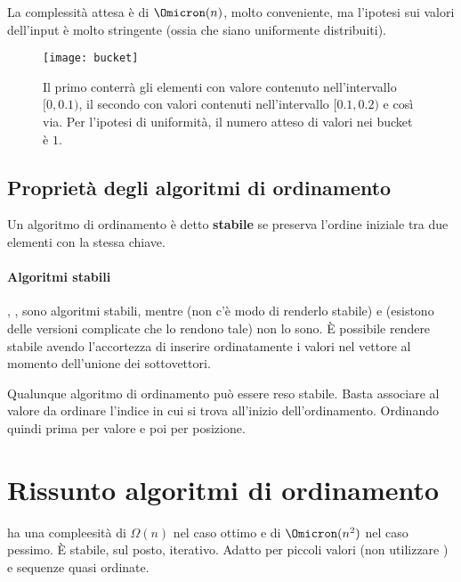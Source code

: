 La complessità attesa è di \(\Omicron(n)\), molto conveniente, ma l'ipotesi sui valori dell'input è molto stringente (ossia che siano uniformente distribuiti).

\begin{figure}[H]\centering
    \texttt{[image: bucket]}
    \caption[]{Il primo  conterrà gli elementi con valore contenuto nell'intervallo \([0, 0.1)\), il secondo con valori contenuti nell'intervallo \([0.1, 0.2)\) e così via. Per l'ipotesi di uniformità, il numero atteso di valori nei bucket è \(1\).}
\end{figure}

\clearpage
\subsection*{Proprietà degli algoritmi di ordinamento}

\begin{definition}[stabilità]
Un algoritmo di ordinamento è detto \textbf{stabile} se preserva l'ordine iniziale tra due elementi con la stessa chiave.
\end{definition}

\paragraph{Algoritmi stabili}
\insertionSort, \mergeSort, \pigeonholeSort sono algoritmi stabili, mentre \heapSort (non c'è modo di renderlo stabile) e \quickSort (esistono delle versioni complicate che lo rendono tale) non lo sono.
\`{E} possibile rendere stabile \mergeSort avendo l'accortezza di inserire ordinatamente i valori nel vettore al momento dell'unione dei sottovettori.

\begin{note}
Qualunque algoritmo di ordinamento può essere reso stabile.
Basta associare al valore da ordinare l'indice in cui si trova all'inizio dell'ordinamento.
Ordinando quindi prima per valore e poi per posizione.
\end{note}

\section{Rissunto algoritmi di ordinamento}

\insertionSort ha una compleesità di \(\Omega(n)\) nel caso ottimo e di \(\Omicron(n^2)\) nel caso pessimo.
\`{E} stabile, sul posto, iterativo.
Adatto per piccoli valori (non utilizzare \quickSort) e sequenze quasi ordinate.

